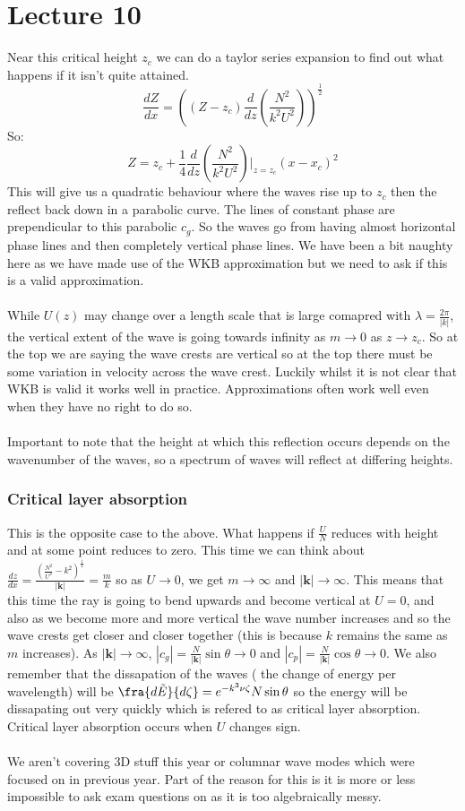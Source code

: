 \documentclass{article}
\begin{document}
\section{Lecture 10}
Near this critical height $z_c$ we can do a taylor series expansion to find out what happens if it isn't quite attained.\\
$$
\frac{dZ}{dx} = ( ( Z- z_c ) \frac{d}{dz}( \frac{N^2}{k^2 U^2}))^{\frac{1}{2}}
$$
So:
$$
Z = z_c + \frac{1}{4} \frac{d}{dz} ( \frac{N^2}{k^2 U^2})|_{z=z_c} ( x- x_c)^2
$$
This will give us a quadratic behaviour where the waves rise up to $z_c$ then the reflect back down in a parabolic curve. The lines of constant phase are prependicular to this parabolic $c_g$. So the waves go from having almost horizontal phase lines and then completely vertical phase lines. We have been a bit naughty here as we have made use of the WKB approximation but we need to ask if this is a valid approximation.\\\\
While $U(z)$ may change over a length scale that is large comapred with $\lambda = \frac{ 2 \pi}{|k|}$, the vertical extent of the wave is going towards infinity as $m \rightarrow 0$ as $z \rightarrow z_c$. So at the top we are saying the wave crests are vertical so at the top there must be some variation in velocity across the wave crest. Luckily whilst it is not clear that WKB is valid it works well in practice. Approximations often work well even when they have no right to do so. \\\\
Important to note that the height at which this reflection occurs depends on the wavenumber of the waves, so a spectrum of waves will reflect at differing heights.
\subsubsection{Critical layer absorption}
This is the opposite case to the above. What happens if $\frac{U}{N}$ reduces with height and at some point reduces to zero. This time we can think about $\frac{dz}{dx} = \frac{(\frac{N^2}{U^2} - k^2)^{\frac{1}{2}}}{|\bm k|} = \frac{m}{k}$ so as $U \rightarrow 0$, we get $m \rightarrow \infty$ and $|\bm k|\rightarrow \infty$. This means that this time the ray is going to bend upwards and become vertical at $U = 0$, and also as we become more and more vertical the wave number increases and so the wave crests get closer and closer together (this is because $k$ remains the same as $m$ increases). As $|\bm k| \rightarrow \infty$, $|c_g| = \frac{N}{|\bm k|} \sin \theta \rightarrow 0$ and $|c_p| = \frac{N}{|\bm k|} \cos \theta \rightarrow 0$. We also remember that the dissapation of the waves ( the change of energy per wavelength) will be $\fra{d \tilde E}{d \zeta} = e^{- k^3 \nu \zeta}{N \sin \theta}$ so the energy will be dissapating out very quickly which is refered to as critical layer absorption. Critical layer absorption occurs when $U$ changes sign.\\\\
We aren't covering 3D stuff this year or columnar wave modes which were focused on in previous year. Part of the reason for this is it is more or less impossible to ask exam questions on as it is too algebraically messy.
\end{document}
